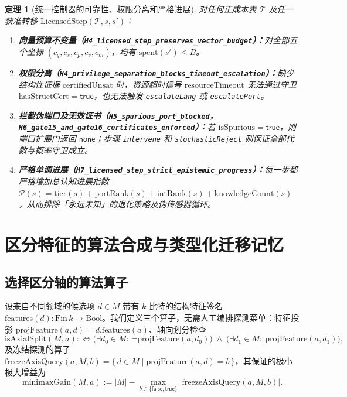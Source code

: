\documentclass[11pt,a4paper]{article}
\theoremstyle{cleanthm}
\newtheorem{theorem}{定理}[section]
\theoremstyle{cleandef}
\begin{document}
\begin{theorem}[统一控制器的可靠性、权限分离和严格进展]
\label{thm:h4_h7_controller}
对任何正成本表 $\mathcal{T}$ 及任一获准转移 $\mathrm{LicensedStep}(\mathcal{T}, s, s')$：
\begin{enumerate}
  \item \textbf{向量预算不变量（\texttt{H4\_licensed\_\allowbreak step\_\allowbreak preserves\_\allowbreak vector\_\allowbreak budget}）：}对全部五个坐标 $(c_q,c_s,c_p,c_v,c_m)$，均有 $\mathrm{spent}(s') \le B$。
  \item \textbf{权限分离（\texttt{H4\_privilege\_\allowbreak separation\_\allowbreak blocks\_\allowbreak timeout\_\allowbreak escalation}）：}缺少结构性证据 $\mathrm{certifiedUnsat}$ 时，资源超时信号 $\mathrm{resourceTimeout}$ 无法通过守卫 $\mathrm{hasStructCert}=\mathsf{true}$，也无法触发 \texttt{escalateLang} 或 \texttt{escalatePort}。
  \item \textbf{拦截伪端口及无效证书（\texttt{H5\_spurious\_\allowbreak port\_\allowbreak blocked}，\texttt{H6\_gate15\_\allowbreak and\_\allowbreak gate16\_\allowbreak certificates\_\allowbreak enforced}）：}若 $\mathrm{isSpurious}=\mathsf{true}$，则端口扩展门返回 $\mathsf{none}$；步骤 \texttt{intervene} 和 \texttt{stochasticReject} 则保证全部代数与概率守卫成立。
  \item \textbf{严格单调进展（\texttt{H7\_licensed\_\allowbreak step\_\allowbreak strict\_\allowbreak epistemic\_\allowbreak progress}）：}每一步都严格增加总认知进展指数 $\mathcal{P}(s) = \mathrm{tier}(s) + \mathrm{portRank}(s) + \mathrm{intRank}(s) + \mathrm{knowledgeCount}(s)$，从而排除「永远未知」的退化策略及伪传感器循环。
\end{enumerate}
\end{theorem}

\section{区分特征的算法合成与类型化迁移记忆}

\subsection{选择区分轴的算法算子}

设来自不同领域的候选项 $d\in M$ 带有 $k$ 比特的结构特征签名 $\mathrm{features}(d):\mathrm{Fin}\,k\to\mathrm{Bool}$。我们定义三个算子，无需人工编排探测菜单：特征投影 $\mathrm{projFeature}(a,d)=d.\mathrm{features}(a)$、轴向划分检查
\begin{equation}
  \mathrm{isAxialSplit}(M, a) :\iff \bigl(\exists d_0\in M:\ \neg\mathrm{projFeature}(a,d_0)\bigr) \;\land\; \bigl(\exists d_1\in M:\ \mathrm{projFeature}(a,d_1)\bigr),
\end{equation}
及冻结探测的算子 $\mathrm{freezeAxisQuery}(a,M,b) = \{\,d\in M \mid \mathrm{projFeature}(a,d)=b\,\}$，其保证的极小极大增益为
\begin{equation}
  \mathrm{minimaxGain}(M,a) := |M| - \max_{b\in\{\mathsf{false},\mathsf{true}\}}\bigl|\mathrm{freezeAxisQuery}(a,M,b)\bigr|.
\end{equation}
\end{document}
